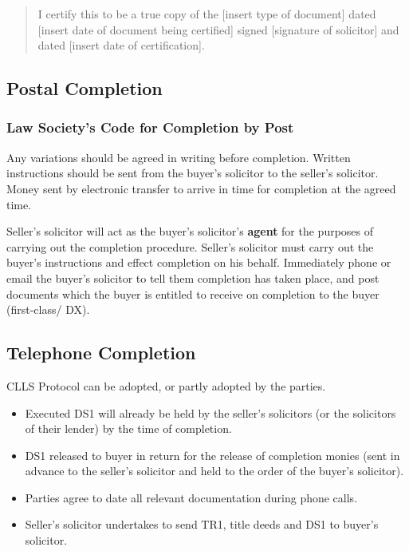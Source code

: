 \documentclass[
]{article}
\providecommand{\tightlist}{%
  \setlength{\itemsep}{0pt}\setlength{\parskip}{0pt}}
\begin{document}
\begin{quote}
I certify this to be a true copy of the {[}insert type of document{]}
dated {[}insert date of document being certified{]} signed {[}signature
of solicitor{]} and dated {[}insert date of certification{]}.
\end{quote}

\hypertarget{postal-completion}{%
\subsection{Postal Completion}\label{postal-completion}}

\hypertarget{law-societys-code-for-completion-by-post}{%
\subsubsection{Law Society's Code for Completion by
Post}\label{law-societys-code-for-completion-by-post}}

Any variations should be agreed in writing before completion. Written
instructions should be sent from the buyer's solicitor to the seller's
solicitor. Money sent by electronic transfer to arrive in time for
completion at the agreed time.

Seller's solicitor will act as the buyer's solicitor's \textbf{agent}
for the purposes of carrying out the completion procedure. Seller's
solicitor must carry out the buyer's instructions and effect completion
on his behalf. Immediately phone or email the buyer's solicitor to tell
them completion has taken place, and post documents which the buyer is
entitled to receive on completion to the buyer (first-class/ DX).

\hypertarget{telephone-completion}{%
\subsection{Telephone Completion}\label{telephone-completion}}

CLLS Protocol can be adopted, or partly adopted by the parties.

\begin{itemize}
\tightlist
\item
  Executed DS1 will already be held by the seller's solicitors (or the
  solicitors of their lender) by the time of completion.
\item
  DS1 released to buyer in return for the release of completion monies
  (sent in advance to the seller's solicitor and held to the order of
  the buyer's solicitor).
\item
  Parties agree to date all relevant documentation during phone calls.
\item
  Seller's solicitor undertakes to send TR1, title deeds and DS1 to
  buyer's solicitor.
\end{itemize}
\end{document}
